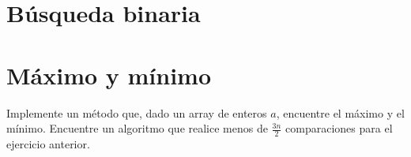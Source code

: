 \section{Búsqueda binaria}


\section{Máximo y mínimo}
Implemente un método que, dado un array de enteros \(a\), encuentre el máximo y el mínimo. Encuentre un algoritmo que realice menos de \(\frac{3 n}{2}\) comparaciones para el ejercicio anterior.

% 

% 
